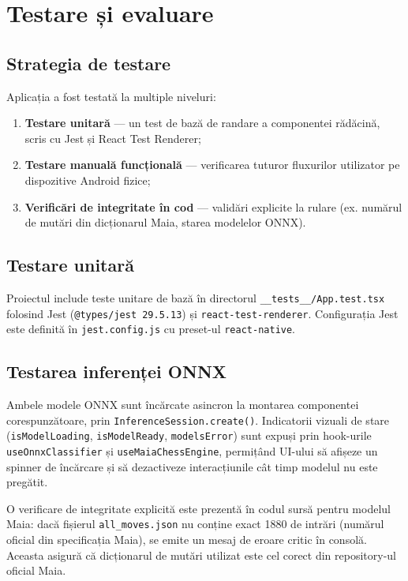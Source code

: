 \documentclass[12pt, a4paper, twoside]{report}
\numberwithin{equation}{section}
\begin{document}
\chapter{Testare și evaluare}

\section{Strategia de testare}

Aplicația a fost testată la multiple niveluri:
\begin{enumerate}
  \item \textbf{Testare unitară} — un test de bază de randare a componentei rădăcină,
    scris cu Jest și React Test Renderer;
  \item \textbf{Testare manuală funcțională} — verificarea tuturor fluxurilor utilizator
    pe dispozitive Android fizice;
  \item \textbf{Verificări de integritate în cod} — validări explicite la rulare (ex.
    numărul de mutări din dicționarul Maia, starea modelelor ONNX).
\end{enumerate}

\section{Testare unitară}

Proiectul include teste unitare de bază în directorul \texttt{\_\_tests\_\_/App.test.tsx}
folosind Jest (\texttt{@types/jest 29.5.13}) și \texttt{react-test-renderer}. Configurația
Jest este definită în \texttt{jest.config.js} cu preset-ul
\texttt{react-native}.

\section{Testarea inferenței ONNX}

Ambele modele ONNX sunt încărcate asincron la montarea componentei corespunzătoare,
prin \texttt{InferenceSession.create()}. Indicatorii vizuali de stare
(\texttt{isModelLoading}, \texttt{isModelReady}, \texttt{modelsError}) sunt expuși
prin hook-urile \texttt{useOnnxClassifier} și \texttt{useMaiaChessEngine}, permițând
UI-ului să afișeze un spinner de încărcare și să dezactiveze interacțiunile cât timp
modelul nu este pregătit.

O verificare de integritate explicită este prezentă în codul sursă pentru modelul Maia:
dacă fișierul \texttt{all\_moves.json} nu conține exact 1880 de intrări (numărul oficial
din specificația Maia), se emite un mesaj de eroare critic în consolă. Aceasta asigură
că dicționarul de mutări utilizat este cel corect din repository-ul oficial Maia.
\end{document}
